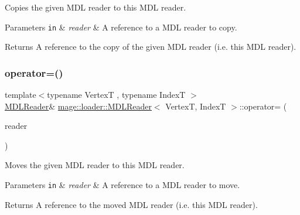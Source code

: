 Copies the given M\+DL reader to this M\+DL reader.


\begin{DoxyParams}[1]{Parameters}
\mbox{\tt in}  & {\em reader} & A reference to a M\+DL reader to copy. \\
\hline
\end{DoxyParams}
\begin{DoxyReturn}{Returns}
A reference to the copy of the given M\+DL reader (i.\+e. this M\+DL reader). 
\end{DoxyReturn}
\hypertarget{classmage_1_1loader_1_1_m_d_l_reader_a2cfae929a5bbd8100a81c25ca36de68c}{}\label{classmage_1_1loader_1_1_m_d_l_reader_a2cfae929a5bbd8100a81c25ca36de68c} 
\subsubsection{\texorpdfstring{operator=()}{operator=()}\hspace{0.1cm}{\footnotesize\ttfamily [2/2]}}
{\footnotesize\ttfamily template$<$typename VertexT , typename IndexT $>$ \\
\hyperlink{classmage_1_1loader_1_1_m_d_l_reader}{M\+D\+L\+Reader}\& \hyperlink{classmage_1_1loader_1_1_m_d_l_reader}{mage\+::loader\+::\+M\+D\+L\+Reader}$<$ VertexT, IndexT $>$\+::operator= (\begin{DoxyParamCaption}\item[{\hyperlink{classmage_1_1loader_1_1_m_d_l_reader}{M\+D\+L\+Reader}$<$ VertexT, IndexT $>$ \&\&}]{reader }\end{DoxyParamCaption})\hspace{0.3cm}{\ttfamily [delete]}}

Moves the given M\+DL reader to this M\+DL reader.


\begin{DoxyParams}[1]{Parameters}
\mbox{\tt in}  & {\em reader} & A reference to a M\+DL reader to move. \\
\hline
\end{DoxyParams}
\begin{DoxyReturn}{Returns}
A reference to the moved M\+DL reader (i.\+e. this M\+DL reader). 
\end{DoxyReturn}
\hypertarget{classmage_1_1loader_1_1_m_d_l_reader_afe56982cb6a6ba9a2ce4abba9cbe3703}{}\label{classmage_1_1loader_1_1_m_d_l_reader_afe56982cb6a6ba9a2ce4abba9cbe3703} 
